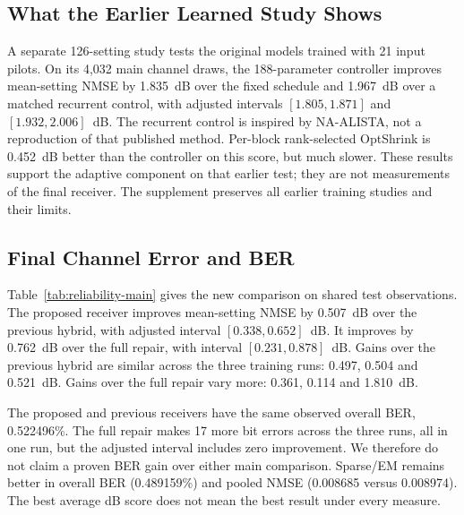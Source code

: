 \subsection{What the Earlier Learned Study Shows}
A separate 126-setting study tests the original models trained with 21 input pilots. On its 4,032 main channel draws, the 188-parameter controller improves mean-setting NMSE by 1.835~dB over the fixed schedule and 1.967~dB over a matched recurrent control, with adjusted intervals $[1.805,1.871]$ and $[1.932,2.006]$~dB. The recurrent control is inspired by NA-ALISTA, not a reproduction of that published method. Per-block rank-selected OptShrink is 0.452~dB better than the controller on this score, but much slower. These results support the adaptive component on that earlier test; they are not measurements of the final receiver. The supplement preserves all earlier training studies and their limits.

\subsection{Final Channel Error and BER}

Table~\ref{tab:reliability-main} gives the new comparison on shared test observations. The proposed receiver improves mean-setting NMSE by 0.507~dB over the previous hybrid, with adjusted interval $[0.338,0.652]$~dB. It improves by 0.762~dB over the full repair, with interval $[0.231,0.878]$~dB. Gains over the previous hybrid are similar across the three training runs: 0.497, 0.504 and 0.521~dB. Gains over the full repair vary more: 0.361, 0.114 and 1.810~dB.

The proposed and previous receivers have the same observed overall BER, 0.522496\%. The full repair makes 17 more bit errors across the three runs, all in one run, but the adjusted interval includes zero improvement. We therefore do not claim a proven BER gain over either main comparison. Sparse/EM remains better in overall BER (0.489159\%) and pooled NMSE (0.008685 versus 0.008974). The best average dB score does not mean the best result under every measure.

